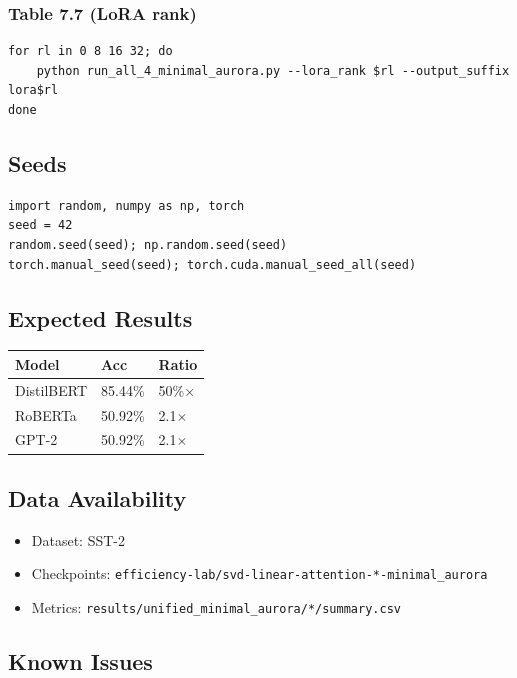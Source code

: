 \subsubsection{Table 7.7 (LoRA rank)}
\begin{lstlisting}
for rl in 0 8 16 32; do
    python run_all_4_minimal_aurora.py --lora_rank $rl --output_suffix lora$rl
done
\end{lstlisting}

\subsection{Seeds}

\begin{lstlisting}
import random, numpy as np, torch
seed = 42
random.seed(seed); np.random.seed(seed)
torch.manual_seed(seed); torch.cuda.manual_seed_all(seed)
\end{lstlisting}

\subsection{Expected Results}

\begin{table}[H]
\centering
\small
\begin{tabular}{lll}
\toprule
\textbf{Model} & \textbf{Acc} & \textbf{Ratio} \\
\midrule
DistilBERT & 85.44\% & 50\%$\times$ \\
RoBERTa & 50.92\% & 2.1$\times$ \\
GPT-2 & 50.92\% & 2.1$\times$ \\
\bottomrule
\end{tabular}
\end{table}

\subsection{Data Availability}

\begin{itemize}
\item Dataset: SST-2
\item Checkpoints: \texttt{efficiency-lab/svd-linear-attention-*-minimal\_aurora}
\item Metrics: \texttt{results/unified\_minimal\_aurora/*/summary.csv}

\end{itemize}
\subsection{Known Issues}

